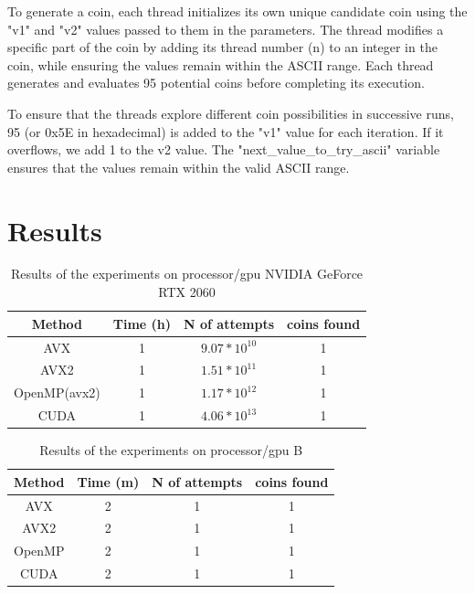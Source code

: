 \documentclass[a4paper,12pt]{article}
\begin{document}
To generate a coin, each thread initializes its own unique candidate coin using the "v1" and "v2" values passed to them in the parameters. The thread modifies a specific part of the coin by adding its thread number (n) to an integer in the coin, while ensuring the values remain within the ASCII range. Each thread generates and evaluates 95 potential coins before completing its execution.

To ensure that the threads explore different coin possibilities in successive runs, 95 (or 0x5E in hexadecimal) is added to the "v1" value for each iteration. If it overflows, we add 1 to the v2 value. The "next\_value\_to\_try\_ascii" variable ensures that the values remain within the valid ASCII range.

\section{Results}
\label{sec:results}

\begin{table}[h]
    \centering
    \begin{tabular}{|c|c|c|c|}
        \hline
        \textbf{Method} & \textbf{Time (h)} & \textbf{N of attempts} & \textbf{coins found} \\
        \hline
        AVX & 1 & $9.07*10^{10}$ & 1  \\
        AVX2 & 1 & $1.51*10^{11}$ & 1 \\
        OpenMP(avx2) & 1 & $1.17*10^{12}$ & 1 \\
        CUDA & 1 & $4.06*10^{13}$ & 1  \\
        \hline
    \end{tabular}
    \caption{Results of the experiments on processor/gpu NVIDIA GeForce RTX 2060}
    \label{tab:results}
\end{table}

\begin{table}[h]
    \centering
    \begin{tabular}{|c|c|c|c|}
        \hline
        \textbf{Method} & \textbf{Time (m)} & \textbf{N of attempts} & \textbf{coins found} \\
        \hline
        AVX & 2 & 1 & 1  \\
        AVX2 & 2 & 1 & 1 \\
        OpenMP & 2 & 1 & 1 \\
        CUDA & 2 & 1 & 1  \\
        \hline
    \end{tabular}
    \caption{Results of the experiments on processor/gpu B}
    \label{tab:results}
\end{table}
\end{document}
